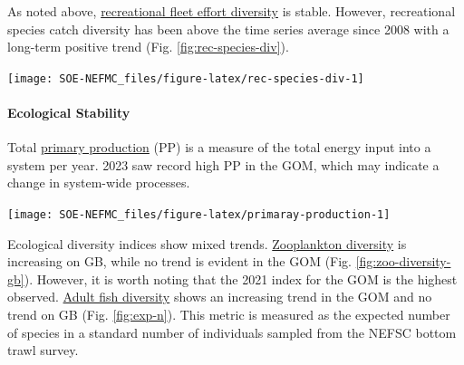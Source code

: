 \documentclass[
  10pt,
]{article}
\let\origfigure\figure
\let\endorigfigure\endfigure
\renewenvironment{figure}[1][2] {
    \expandafter\origfigure\expandafter[H]
} {
    \endorigfigure
}
\begin{document}
As noted above, \href{https://noaa-edab.github.io/catalog/recdat.html}{recreational fleet effort diversity} is stable. However, recreational species catch diversity has been above the time series average since 2008 with a long-term positive trend (Fig. \ref{fig:rec-species-div}).

\begin{figure}

{\centering \texttt{[image: SOE-NEFMC\_files/figure-latex/rec-species-div-1]} 

}

\caption{Diversity of recreational catch in New England.}\label{fig:rec-species-div}
\end{figure}

\hypertarget{ecological-stability}{%
\paragraph{Ecological Stability}\label{ecological-stability}}

Total \href{https://noaa-edab.github.io/catalog/chl_pp.html}{primary production} (PP) is a measure of the total energy input into a system per year. 2023 saw record high PP in the GOM, which may indicate a change in system-wide processes.

\begin{figure}

{\centering \texttt{[image: SOE-NEFMC\_files/figure-latex/primaray-production-1]} 

}

\caption{Total areal annual primary production by ecological production unit. The dashed line represents the long-term (1998-2023) annual mean.}\label{fig:primaray-production}
\end{figure}

Ecological diversity indices show mixed trends. \href{https://noaa-edab.github.io/catalog/zoo_diversity.html}{Zooplankton diversity} is increasing on GB, while no trend is evident in the GOM (Fig. \ref{fig:zoo-diversity-gb}). However, it is worth noting that the 2021 index for the GOM is the highest observed. \href{https://noaa-edab.github.io/catalog/exp_n.html}{Adult fish diversity} shows an increasing trend in the GOM and no trend on GB (Fig. \ref{fig:exp-n}). This metric is measured as the expected number of species in a standard number of individuals sampled from the NEFSC bottom trawl survey.
\end{document}

